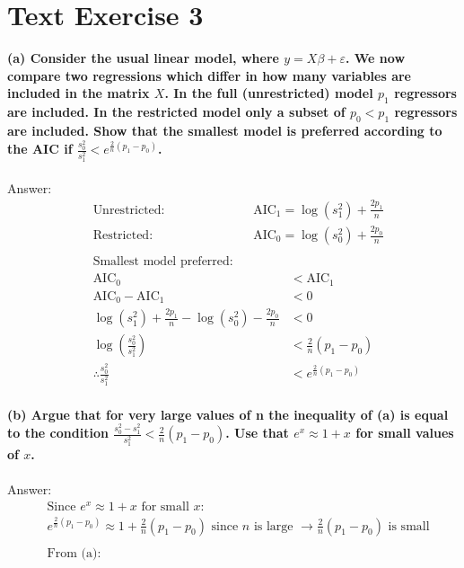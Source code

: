 \documentclass[12pt, a4paper]{article}
\begin{document}
\section*{Text Exercise 3}
\vspace{1em}

\textbf{(a) Consider the usual linear model, where $y = X\beta + \varepsilon$. We now compare two regressions which differ in how many variables are included in the matrix $X$. In the full (unrestricted) model $p_1$ regressors are included. In the restricted model only a subset of $p_0 < p_1$ regressors are included. Show that the smallest model is preferred according to the AIC if $\frac{s_0^2}{s_1^2} < e^{\frac{2}{n}(p_1 - p_0)}$.} \\\\
Answer:
\begin{align*}
    &\text{Unrestricted:}&& \text{AIC}_1 = \log(s_1^2) + \frac{2p_1}{n}\\  
    &\text{Restricted:} &&\text{AIC}_0 = \log(s_0^2) + \frac{2p_0}{n}\\\\  
    &\text{Smallest model preferred}: 
\end{align*}
\begin{align*}
    \text{AIC}_0 &< \text{AIC}_1\\
    \text{AIC}_0 - \text{AIC}_1 &< 0\\
    \log(s_1^2) + \frac{2p_1}{n} - \log(s_0^2) - \frac{2p_0}{n} &< 0\\
    \log\left(\frac{s_0^2}{s_1^2}\right) &< \frac{2}{n}(p_1 - p_0)\\
    \therefore\frac{s_0^2}{s_1^2} &< e^{\frac{2}{n}(p_1 - p_0)}
\end{align*}
\vspace{30em}\\
\textbf{(b) Argue that for very large values of n the inequality of (a) is equal to the condition $\frac{s_0^2 - s_1^2}{s_1^2} < \frac{2}{n}(p_1 - p_0)$. Use that $e^x \approx 1 + x$ for small values of $x$.}\\\\
Answer:
\begin{align*}
    &\text{Since }e^x \approx 1 + x\text{ for small }x:\\
    &e^{\frac{2}{n}(p_1 - p_0)} \approx 1 + \frac{2}{n}(p_1 - p_0) \text{ since $n$ is large $\rightarrow \frac{2}{n}(p_1 - p_0)$ is small}\\\\
    &\text{From (a):}
\end{align*}
\end{document}

